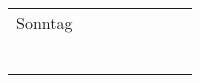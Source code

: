 \documentclass[a4paper]{article}
\begin{document}
\begin{tabular}{lc||c|c|c||c|c|c}
             &         &       &        &          &         &       &      \\
  \midrule
  Sonntag    &         &       &        &          &         &       &      \\
             &         &       &        &          &         &       &      \\
             &         &       &        &          &         &       &      \\
             &         &       &        &          &         &       &      \\
             &         &       &        &          &         &       &      \\
             &         &       &        &          &         &       &      \\
             &         &       &        &          &         &       &      \\
  \bottomrule
\end{tabular}
\end{document}
